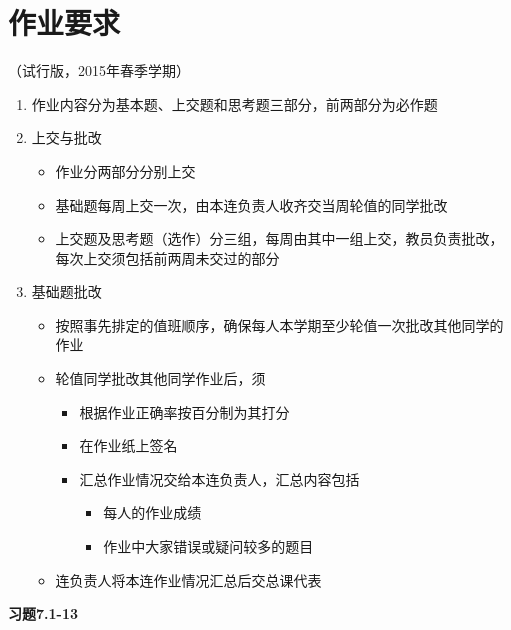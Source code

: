 \newpage

\section*{作业要求}

\begin{center}
	（试行版，2015年春季学期）
\end{center}

\begin{enumerate}
  \item 作业内容分为基本题、上交题和思考题三部分，前两部分为必作题
  \item 上交与批改
  \begin{itemize}
    \item 作业分两部分分别上交
    \item 基础题每周上交一次，由本连负责人收齐交当周轮值的同学批改
    \item 上交题及思考题（选作）分三组，每周由其中一组上交，教员负责批改，
    每次上交须包括前两周未交过的部分
  \end{itemize}
  \item 基础题批改
  \begin{itemize}
    \item 按照事先排定的值班顺序，确保每人本学期至少轮值一次批改其他同学的作业
    \item 轮值同学批改其他同学作业后，须
    \begin{itemize}
      \item 根据作业正确率按百分制为其打分
      \item 在作业纸上签名
      \item 汇总作业情况交给本连负责人，汇总内容包括
      \begin{itemize}
        \item 每人的作业成绩
        \item 作业中大家错误或疑问较多的题目
      \end{itemize}
    \end{itemize}
    \item 连负责人将本连作业情况汇总后交总课代表
  \end{itemize}
\end{enumerate}

\newpage

{\bf 习题7.1-13}

\begin{center}
\end{center}

